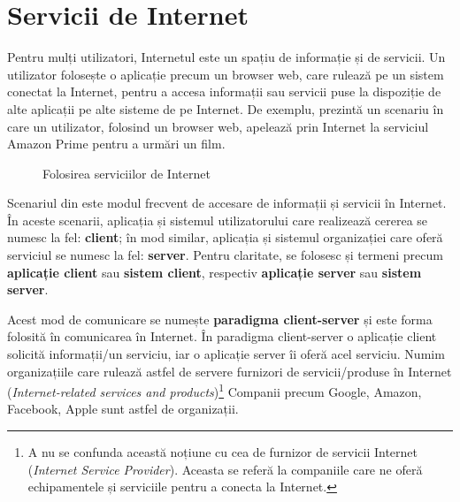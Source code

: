 \section{Servicii de Internet}
\label{sec:net:internet-services}

Pentru mulți utilizatori, Internetul este un spațiu de informație și de servicii.
Un utilizator folosește o aplicație precum un browser web, care rulează pe un sistem conectat la Internet, pentru a accesa informații sau servicii puse la dispoziție de alte aplicații pe alte sisteme de pe Internet.
De exemplu,  prezintă un scenariu în care un utilizator, folosind un browser web, apelează prin Internet la serviciul Amazon Prime pentru a urmări un film.

\begin{figure}[htbp]
  \centering
  \def\svgwidth{\columnwidth}
  
  \caption{Folosirea serviciilor de Internet}
  \label{fig:net:internet-amazon-service}
\end{figure}

Scenariul din  este modul frecvent de accesare de informații și servicii în Internet.
În aceste scenarii, aplicația și sistemul utilizatorului care realizează cererea se numesc la fel: \textbf{client};
în mod similar, aplicația și sistemul organizației care oferă serviciul se numesc la fel: \textbf{server}.
Pentru claritate, se folosesc și termeni precum \textbf{aplicație client} sau \textbf{sistem client}, respectiv \textbf{aplicație server} sau \textbf{sistem server}.

Acest mod de comunicare se numește \textbf{paradigma client-server} și este forma folosită în comunicarea în Internet.
În paradigma client-server o aplicație client solicită informații/un serviciu, iar o aplicație server îi oferă acel serviciu.
Numim organizațiile care rulează astfel de servere furnizori de servicii/produse în Internet (\textit{Internet-related services and products})\footnote{A nu se confunda această noțiune cu cea de furnizor de servicii Internet (\textit{Internet Service Provider}). Aceasta se referă la companiile care ne oferă echipamentele și serviciile pentru a conecta la Internet.}
Companii precum Google, Amazon, Facebook, Apple sunt astfel de organizații.

